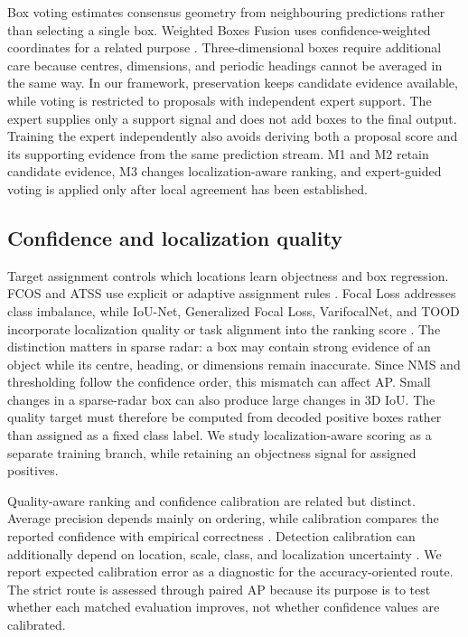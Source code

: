 \documentclass[sensors,article,submit,pdftex,moreauthors]{Definitions/mdpi}
\begin{document}
Box voting estimates consensus geometry from neighbouring predictions rather
than selecting a single box. Weighted Boxes Fusion uses confidence-weighted
coordinates for a related purpose \cite{solovyev2021wbf}. Three-dimensional
boxes require additional care because centres, dimensions, and periodic
headings cannot be averaged in the same way. In our framework, preservation
keeps candidate evidence available, while voting is restricted to proposals
with independent expert support. The expert supplies only a support signal and
does not add boxes to the final output. Training the expert independently also
avoids deriving both a proposal score and its supporting evidence from the same
prediction stream. M1 and M2 retain candidate evidence, M3
changes localization-aware ranking, and expert-guided voting is applied only
after local agreement has been established.

\subsection{Confidence and localization quality}

Target assignment controls which locations learn objectness and box
regression. FCOS and ATSS use explicit or adaptive assignment rules
\cite{tian2019fcos,zhang2020atss}. Focal Loss addresses class imbalance, while
IoU-Net, Generalized Focal Loss, VarifocalNet, and TOOD incorporate localization
quality or task alignment into the ranking score
\cite{lin2017focal,jiang2018iounet,li2022gfl,zhang2021varifocalnet,feng2021tood}.
The distinction matters in sparse radar: a box may contain strong evidence of
an object while its centre, heading, or dimensions remain inaccurate. Since NMS
and thresholding follow the confidence order, this mismatch can affect AP.
Small changes in a sparse-radar box can also produce large changes in 3D IoU.
The quality target must therefore be computed from decoded positive boxes
rather than assigned as a fixed class label. We study localization-aware
scoring as a separate training branch,
while retaining an objectness signal for assigned positives.

Quality-aware ranking and confidence calibration are related but distinct.
Average precision depends mainly on ordering, while calibration compares the
reported confidence with empirical correctness \cite{guo2017calibration}.
Detection calibration can additionally depend on location, scale, class, and
localization uncertainty
\cite{kuppers2020detectioncalibration,pathiraja2023mccl}. We report expected
calibration error as a diagnostic for the accuracy-oriented route. The strict
route is assessed through paired AP because its purpose is to test whether each
matched evaluation improves, not whether confidence values are calibrated.
\end{document}
